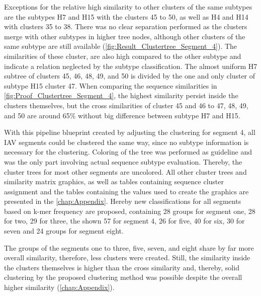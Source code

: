 Exceptions for the relative high similarity to other clusters of the same subtypes are the subtypes H7 and H15 with the clusters 45 to 50, as well as H4 and H14 with clusters 35 to 38. There was no clear separation performed as the clusters merge with other subtypes in higher tree nodes, although other clusters of the same subtype are still available (\autoref{fig:Result_Clustertree_Segment_4}). The similarities of these cluster, are also high compared to the other subtype and indicate a relation neglected by the subtype classification. The almost uniform H7 subtree of clusters 45, 46, 48, 49, and 50 is divided by the one and only cluster of subtype H15 cluster 47. When comparing the sequence similarities in \autoref{fig:Proof_Clustertree_Segment_4}, the highest similarity persist inside the clusters themselves, but the cross similarities of cluster 45 and 46 to 47, 48, 49, and 50 are around 65\% without big difference between subtype H7 and H15.  

With this pipeline blueprint created by adjusting the clustering for segment 4, all \gls{IAV} segments could be clustered the same way, since no subtype information is necessary for the clustering. Coloring of the tree was performed as guideline and was the only part involving actual sequence subtype evaluation. Thereby, the cluster trees for most other segments are uncolored. All other cluster trees and similarity matrix graphics, as well as tables containing sequence cluster assignment and the tables containing the values used to create the graphics are presented in the \autoref{chap:Appendix}. Hereby new classifications for all segments based on k-mer frequency are proposed, containing 28 groups for segment one, 28 for two, 29 for three, the shown 57 for segment 4, 26 for five, 40 for six, 30 for seven and 24 groups for segment eight. 

The groups of the segments one to three, five, seven, and eight share by far more overall similarity, therefore, less clusters were created. Still, the similarity inside the clusters themselves is higher than the cross similarity and, thereby, solid clustering by the proposed clustering method was possible despite the overall higher similarity (\autoref{chap:Appendix}). 